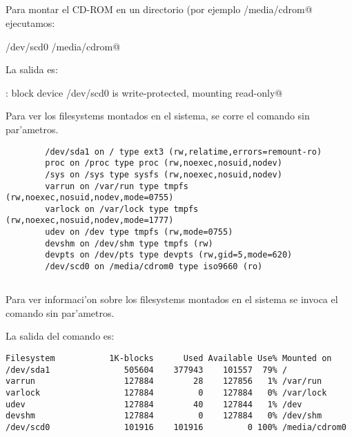 	\subsection{}

		Para montar el CD-ROM en un directorio (por ejemplo \verb@/media/cdrom@ ejecutamos:

		\verb@mount /dev/scd0 /media/cdrom@

		La salida es:

		\verb@mount: block device /dev/scd0 is write-protected, mounting read-only@
		
		Para ver los filesystems montados en el sistema, se corre el comando \verb@mount@ sin par'ametros.
      \begin{mylisting}
			\begin{verbatim}
        /dev/sda1 on / type ext3 (rw,relatime,errors=remount-ro)
        proc on /proc type proc (rw,noexec,nosuid,nodev)
        /sys on /sys type sysfs (rw,noexec,nosuid,nodev)
        varrun on /var/run type tmpfs (rw,noexec,nosuid,nodev,mode=0755)
        varlock on /var/lock type tmpfs (rw,noexec,nosuid,nodev,mode=1777)
        udev on /dev type tmpfs (rw,mode=0755)
        devshm on /dev/shm type tmpfs (rw)
        devpts on /dev/pts type devpts (rw,gid=5,mode=620)
        /dev/scd0 on /media/cdrom0 type iso9660 (ro)
			\end{verbatim}
			\end{mylisting}

	\subsection{}
	
		Para ver informaci'on sobre los filesystems montados en el sistema se invoca el comando \verb@df@ sin par'ametros.

		La salida del comando es:
		\begin{mylisting}
		\begin{verbatim}
Filesystem           1K-blocks      Used Available Use% Mounted on
/dev/sda1               505604    377943    101557  79% /
varrun                  127884        28    127856   1% /var/run
varlock                 127884         0    127884   0% /var/lock
udev                    127884        40    127844   1% /dev
devshm                  127884         0    127884   0% /dev/shm
/dev/scd0               101916    101916         0 100% /media/cdrom0
		\end{verbatim}
		\end{mylisting}
	
